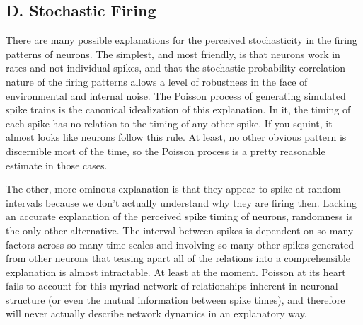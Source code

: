\documentclass[12pt]{article}
\begin{document}
\subsection{D. Stochastic Firing}

There are many possible explanations for the perceived stochasticity in the firing patterns of neurons.  The simplest, and most friendly, is that neurons work in rates and not individual spikes, and that the stochastic probability-correlation nature of the firing patterns allows a level of robustness in the face of environmental and internal noise.  The Poisson process of generating simulated spike trains is the canonical idealization of this explanation.  In it, the timing of each spike has no relation to the timing of any other spike.  If you squint, it almost looks like neurons follow this rule.  At least, no other obvious pattern is discernible most of the time, so the Poisson process is a pretty reasonable estimate in those cases.  

The other, more ominous explanation is that they appear to spike at random intervals because we don't actually understand why they are firing then.  Lacking an accurate explanation of the perceived spike timing of neurons, randomness is the only other alternative.  The interval between spikes is dependent on so many factors across so many time scales and involving so many other spikes generated from other neurons that teasing apart all of the relations into a comprehensible explanation is almost intractable.  At least at the moment.  Poisson at its heart fails to account for this myriad network of relationships inherent in neuronal structure (or even the mutual information between spike times), and therefore will never actually describe network dynamics in an explanatory way.  
\end{document}
